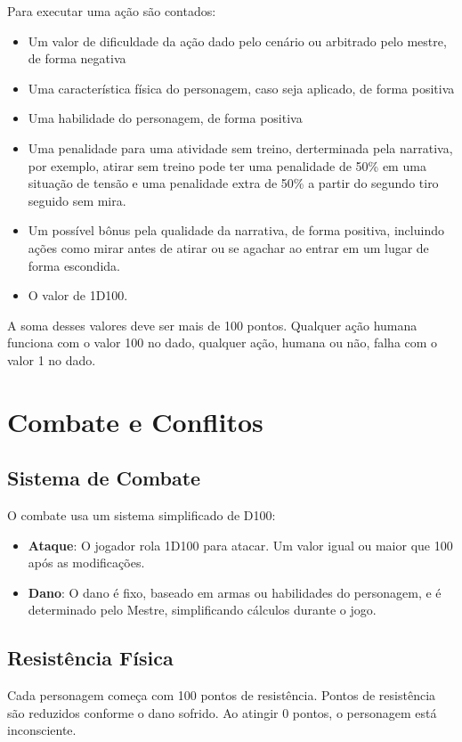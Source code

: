 \documentclass[a4paper,12pt]{book}
\begin{document}
Para executar uma ação são contados:
\begin{itemize}
\item Um valor de dificuldade da ação dado pelo cenário ou arbitrado pelo mestre, de forma negativa
\item Uma característica física do personagem, caso seja aplicado, de forma positiva
\item Uma habilidade do personagem, de forma positiva
\item Uma penalidade para uma atividade sem treino, derterminada pela narrativa, por exemplo, atirar sem treino pode ter uma penalidade de 50\% em uma situação de tensão e uma penalidade extra de 50\% a partir do segundo tiro seguido sem mira.
\item Um possível bônus pela qualidade da narrativa, de forma positiva, incluindo ações como mirar antes de atirar ou se agachar ao entrar em um lugar de forma escondida.
\item O valor de 1D100.
\end{itemize}


A soma desses valores deve ser mais de 100 pontos. Qualquer ação humana funciona com o valor 100 no dado, qualquer ação, humana ou não, falha com o valor 1 no dado.

\chapter{Combate e Conflitos}

\section{Sistema de Combate}

O combate usa um sistema simplificado de D100:
\begin{itemize}
    \item \textbf{Ataque}: O jogador rola 1D100 para atacar. Um valor igual ou maior que 100 após as modificações.
    \item \textbf{Dano}: O dano é fixo, baseado em armas ou habilidades do personagem, e é determinado pelo Mestre, simplificando cálculos durante o jogo.
\end{itemize}


\section{Resistência Física}

Cada personagem começa com 100 pontos de resistência. Pontos de resistência são reduzidos conforme o dano sofrido. Ao atingir 0 pontos, o personagem está inconsciente.
\end{document}
